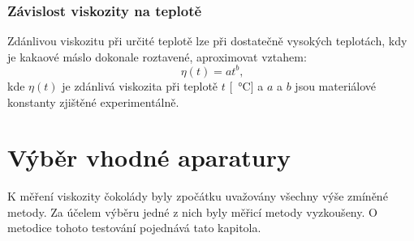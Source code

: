 \documentclass[12pt]{article}
\begin{document}
\subsubsection{Závislost viskozity na teplotě}%

Zdánlivou viskozitu při určité teplotě lze při dostatečně vysokých teplotách, kdy je kakaové máslo dokonale roztavené, aproximovat vztahem:~\cite{article:Rheological_behaviour_chocolate_temeperature}
\begin{equation}
    \eta(t) = at^b\text{,}
\end{equation}
kde $\eta(t)$ je zdánlivá viskozita při teplotě $t$ [\SI{}{\degreeCelsius}] a $a$ a $b$ jsou materiálové konstanty zjištěné experimentálně.

\newpage%
\section{Výběr vhodné aparatury}%

K měření viskozity čokolády byly zpočátku uvažovány všechny výše zmíněné metody. Za účelem výběru jedné z nich byly měřicí metody vyzkoušeny. O metodice tohoto testování pojednává tato kapitola.
\end{document}
